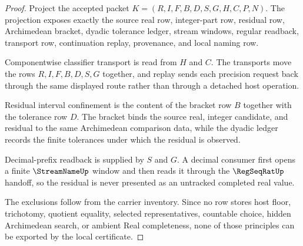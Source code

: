 \begin{proof}
Project the accepted packet $K=(R,I,F,B,D,S,G,H,C,P,N)$. The projection exposes exactly the source real row, integer-part row, residual row, Archimedean bracket, dyadic tolerance ledger, stream windows, regular readback, transport row, continuation replay, provenance, and local naming row.

Componentwise classifier transport is read from $H$ and $C$. The transports move the rows $R,I,F,B,D,S,G$ together, and replay sends each precision request back through the same displayed route rather than through a detached host operation.

Residual interval confinement is the content of the bracket row $B$ together with the tolerance row $D$. The bracket binds the source real, integer candidate, and residual to the same Archimedean comparison data, while the dyadic ledger records the finite tolerances under which the residual is observed.

Decimal-prefix readback is supplied by $S$ and $G$. A decimal consumer first opens a finite $\StreamNameUp$ window and then reads it through the $\RegSeqRatUp$ handoff, so the residual is never presented as an untracked completed real value.

The exclusions follow from the carrier inventory. Since no row stores host floor, trichotomy, quotient equality, selected representatives, countable choice, hidden Archimedean search, or ambient Real completeness, none of those principles can be exported by the local certificate.
\end{proof}

